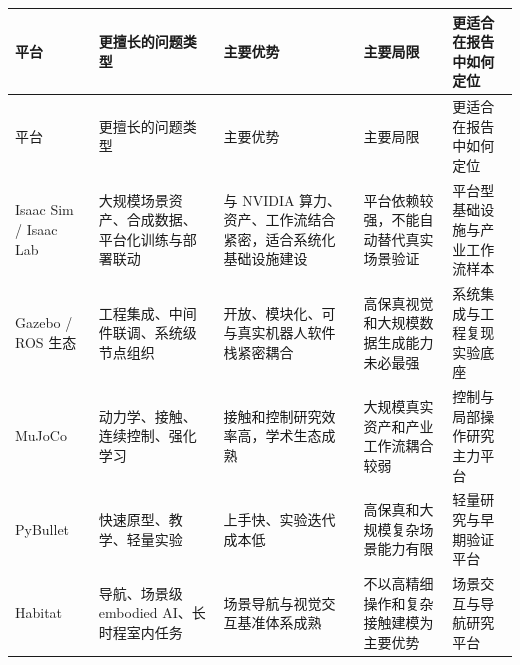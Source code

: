 \begingroup
\small
\begin{xltabular}{\textwidth}{YYYYY}
\toprule
平台 & 更擅长的问题类型 & 主要优势 & 主要局限 & 更适合在报告中如何定位 \\
\midrule
\endfirsthead
\toprule
平台 & 更擅长的问题类型 & 主要优势 & 主要局限 & 更适合在报告中如何定位 \\
\midrule
\endhead
Isaac Sim / Isaac Lab & 大规模场景资产、合成数据、平台化训练与部署联动 & 与 NVIDIA 算力、资产、工作流结合紧密，适合系统化基础设施建设 & 平台依赖较强，不能自动替代真实场景验证 & 平台型基础设施与产业工作流样本 \\
Gazebo / ROS 生态 & 工程集成、中间件联调、系统级节点组织 & 开放、模块化、可与真实机器人软件栈紧密耦合 & 高保真视觉和大规模数据生成能力未必最强 & 系统集成与工程复现实验底座 \\
MuJoCo & 动力学、接触、连续控制、强化学习 & 接触和控制研究效率高，学术生态成熟 & 大规模真实资产和产业工作流耦合较弱 & 控制与局部操作研究主力平台 \\
PyBullet & 快速原型、教学、轻量实验 & 上手快、实验迭代成本低 & 高保真和大规模复杂场景能力有限 & 轻量研究与早期验证平台 \\
Habitat & 导航、场景级 embodied AI、长时程室内任务 & 场景导航与视觉交互基准体系成熟 & 不以高精细操作和复杂接触建模为主要优势 & 场景交互与导航研究平台 \\
\bottomrule
\end{xltabular}
\endgroup
